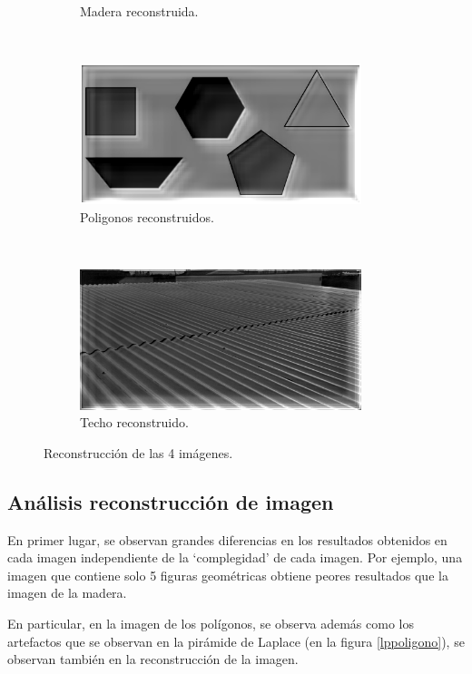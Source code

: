 \documentclass[12pt, letterpaper]{article}
\begin{document}
\begin{figure}[H]
\begin{subfigure}[t]{0.46\textwidth}
      \caption{Madera reconstruida.}
  \end{subfigure}
  ~ 
  \begin{subfigure}[t]{0.46\textwidth}
      \centering
      \includegraphics[width = 0.9\textwidth]{poligono/reconstr.png}
      \caption{Poligonos reconstruidos.}
  \end{subfigure}
  ~ 
  \begin{subfigure}[t]{0.46\textwidth}
      \centering
      \includegraphics[width = 0.9\textwidth]{techo/reconstr.png}
      \caption{Techo reconstruido.}
  \end{subfigure}
  \caption{Reconstrucción de las 4 imágenes.}
  \label{reconstrIm}
\end{figure}

\subsection{Análisis reconstrucción de imagen}

\par En primer lugar, se observan grandes diferencias en los resultados obtenidos en cada imagen independiente de la `complegidad' de cada imagen. Por ejemplo, una imagen que contiene solo 5 figuras geométricas obtiene peores resultados que la imagen de la madera. 

\par En particular, en la imagen de los polígonos, se observa además como los artefactos que se observan en la pirámide de Laplace (en la figura \ref{lppoligono}), se observan también en la reconstrucción de la imagen.
\end{document}
